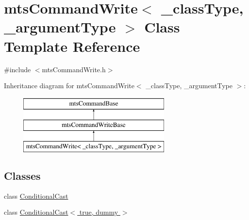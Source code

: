 \hypertarget{classmts_command_write}{\section{mts\-Command\-Write$<$ \-\_\-class\-Type, \-\_\-argument\-Type $>$ Class Template Reference}
\label{classmts_command_write}
}


{\ttfamily \#include $<$mts\-Command\-Write.\-h$>$}

Inheritance diagram for mts\-Command\-Write$<$ \-\_\-class\-Type, \-\_\-argument\-Type $>$\-:\begin{figure}[H]
\begin{center}
\leavevmode
\includegraphics[height=3.000000cm]{d9/d13/classmts_command_write}
\end{center}
\end{figure}
\subsection*{Classes}
\begin{DoxyCompactItemize}
\item 
class \hyperlink{classmts_command_write_1_1_conditional_cast}{Conditional\-Cast}
\item 
class \hyperlink{classmts_command_write_1_1_conditional_cast_3_01true_00_01dummy_01_4}{Conditional\-Cast$<$ true, dummy $>$}
\end{DoxyCompactItemize}

